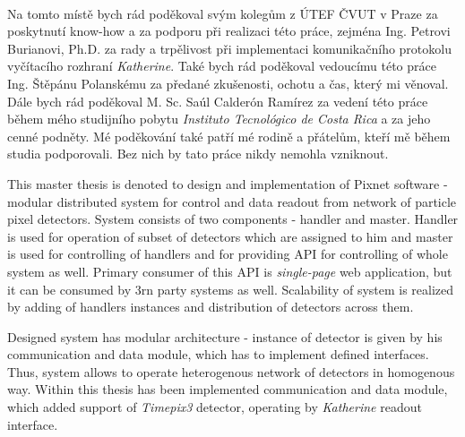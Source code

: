 \documentclass[11pt,twoside,a4paper]{book}
\begin{document}
	\translate				%


	\coverpagestarts

	\newpage~
	
	
	\newpage

	\acknowledgements
	\noindent
	Na tomto místě bych rád poděkoval svým kolegům z ÚTEF ČVUT v Praze za poskytnutí know-how a za podporu při realizaci této práce, zejména Ing. Petrovi Burianovi, Ph.D. za rady a trpělivost při implementaci komunikačního protokolu vyčítacího rozhraní \textit{Katherine}. Také bych rád poděkoval vedoucímu této práce Ing. Štěpánu Polanskému za předané zkušenosti, ochotu a čas, který mi věnoval. Dále bych rád poděkoval M. Sc. Saúl Calderón Ramírez za vedení této práce během mého studijního pobytu \textit{Instituto Tecnológico de Costa Rica} a za jeho cenné podněty. Mé poděkování také patří mé rodině a přátelům, kteří mě během studia podporovali. Bez nich by tato práce nikdy nemohla vzniknout.





 
	\abstractpage
	This master thesis is denoted to design and implementation of Pixnet software - modular distributed system for control and data readout from network of particle pixel detectors. System consists of two components - handler and master. Handler is used for operation of subset of detectors which are assigned to him and master is used for controlling of handlers and for providing API for controlling of whole system as well. Primary consumer of this API is \textit{single-page} web application, but it can be consumed by 3rn party systems as well. Scalability of system is realized by adding of handlers instances and distribution of detectors across them.

	Designed system has modular architecture - instance of detector is given by his communication and data module, which has to implement defined interfaces. Thus, system allows to operate heterogenous network of detectors in homogenous way. Within this thesis has been implemented communication and data module, which added support of \textit{Timepix3} detector, operating by \textit{Katherine} readout interface.
\end{document}
